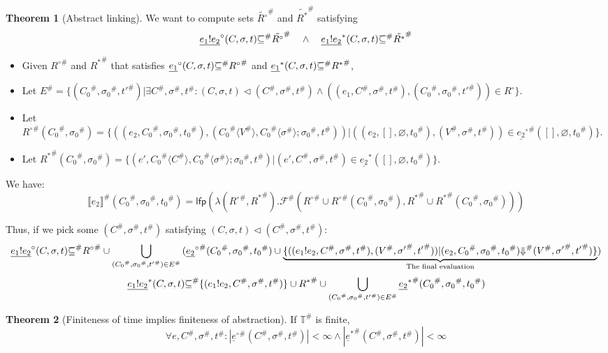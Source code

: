\documentclass{article}
\theoremstyle{definition}
\newtheorem{thm}{Theorem}[section]
\def\ovbarw{1.2mu}
\def\ovbarh{0.8}
\newcommand*{\ovbar}[1]{\mkern \ovbarw\overline{\mkern-\ovbarw{\smash{#1}\scalebox{1}[\ovbarh]{\vphantom{i}}}\mkern-\ovbarw}\mkern \ovbarw}
\newcommand*{\A}[1]{{#1}^{\#}}
\newcommand*{\ATime}{\mathbb{T}^{\#}}
\newcommand*{\link}[2]{{#1}\mathtt{!}{#2}}
\newcommand*{\Reach}[1]{\underline{#1}^{*}}
\newcommand*{\Resolved}[1]{\underline{#1}^{\circ}}
\newcommand*{\sembracket}[1]{\lBrack{#1}\rBrack}
\newcommand*{\inject}[2]{{#1}\langle{#2}\rangle}
\begin{document}
\begin{thm}[Abstract linking]
  We want to compute sets $\tilde{R^{\circ}}^{\#}$ and $\tilde{R^{*}}^{\#}$ satisfying
  \[
    \Resolved{\link{e_1}{e_2}}(C,\sigma,t)\ovbar{\subseteq}^{\#} \tilde{R^{\circ}}^{\#}
    \quad\wedge\quad
    \Reach{\link{e_1}{e_2}}(C,\sigma,t)\ovbar{\subseteq}^{\#} \tilde{R^{*}}^{\#}
  \]

  \begin{itemize}
    \item Given ${R^{\circ}}^{\#}$ and ${R^{*}}^{\#}$ that satisfies $\Resolved{e_1}(C,\sigma,t)\ovbar{\subseteq}^{\#} {R^{\circ}}^{\#}$ and $\Reach{e_1}(C,\sigma,t)\ovbar{\subseteq}^{\#} {R^{*}}^{\#}$,
    \item Let $\A{E}=\{(\A{C_{0}},\A{\sigma_{0}},\A{t'})|\exists \A{C},\A{\sigma},\A{t}:(C,\sigma,t)\lhd(\A{C},\A{\sigma},\A{t})\wedge((e_{1},\A{C},\A{\sigma},\A{t}),(\A{C_{0}},\A{\sigma_{0}},\A{t'}))\in R^{\circ}\}$.
    \item Let $\A{R^{\circ}}(\A{C_{0}},\A{\sigma_{0}})=\{((e_{2},\A{C_{0}},\A{\sigma_{0}},\A{t_{0}}), (\inject{\A{C_{0}}}{\A{V}},\inject{\A{C_{0}}}{\A{\sigma}};\A{\sigma_{0}},\A{t}))|((e_{2},[],\varnothing,\A{t_{0}}),(\A{V},\A{\sigma},\A{t}))\in\A{\Resolved{e_{2}}}([],\varnothing,\A{t_{0}})\}$.
    \item Let $\A{R^{*}}(\A{C_{0}},\A{\sigma_{0}})=\{(e',\inject{\A{C_{0}}}{\A{C}},\inject{\A{C_{0}}}{\A{\sigma}};\A{\sigma_{0}},\A{t})|(e',\A{C},\A{\sigma},\A{t})\in\Reach{e_{2}}([],\varnothing,\A{t_{0}})\}$.
  \end{itemize}

  We have:
  \[
    \A{\sembracket{e_{2}}}(\A{C_{0}},\A{\sigma_{0}},\A{t_{0}})=\mathsf{lfp}(\lambda (\A{R^{\circ}}, \A{R^{*}}).\A{\mathcal{F}}(\A{R^{\circ}}\cup \A{R^{\circ}}(\A{C_{0}},\A{\sigma_{0}}), \A{R^{*}}\cup \A{R^{*}}(\A{C_{0}},\A{\sigma_{0}})))
  \]

  Thus, if we pick some $(\A{C},\A{\sigma},\A{t})$ satisfying $(C,\sigma,t)\lhd(\A{C},\A{\sigma},\A{t})$:
  \[
    \Resolved{\link{e_1}{e_2}}(C,\sigma,t)\A{\ovbar{\subseteq}}
    \A{R^{\circ}}\cup\bigcup_{(\A{C_{0}},\A{\sigma_{0}},\A{t'})\in \A{E}}{(\A{\Resolved{e_2}}(\A{C_{0}},\A{\sigma_{0}},\A{t_{0}})\cup\underbrace{\{((\link{e_1}{e_2}, \A{C}, \A{\sigma}, \A{t}), (\A{V},\A{\sigma'},\A{t'}))|(e_{2},\A{C_{0}},\A{\sigma_{0}},\A{t_{0}})\A{\Downarrow}(\A{V},\A{\sigma'},\A{t'})\}}_{\text{The final evaluation}})}
  \]
  \begin{align*}
    \Reach{\link{e_1}{e_2}}(C,\sigma,t)\A{\ovbar{\subseteq}}\{(\link{e_1}{e_2},\A{C},\A{\sigma},\A{t})\}\cup \A{R^{*}}\cup\bigcup_{(\A{C_{0}},\A{\sigma_{0}},\A{t'})\in \A{E}}{\A{\Reach{e_2}}(\A{C_{0}},\A{\sigma_{0}},\A{t_{0}})}
  \end{align*}
\end{thm}

\begin{thm}[Finiteness of time implies finiteness of abstraction]
  If $\ATime$ is finite,
  \[
    \forall e,\A{C},\A{\sigma},\A{t}: |\A{\Resolved{e}}(\A{C},\A{\sigma},\A{t})|<\infty\wedge|\A{\Reach{e}}(\A{C},\A{\sigma},\A{t})|<\infty
  \]
\end{thm}

\printbibliography
\end{document}
